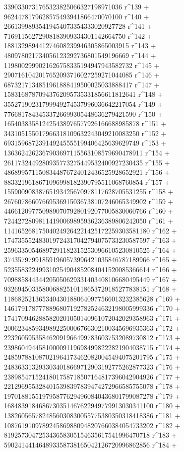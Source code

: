        3390330731765323825066327198971036 r^139 + 
       9624478179628575493941866470070100 r^140 + 
       26613998935419454073354333020927728 r^141 + 
       71691156272908183909334301142664750 r^142 + 
       188132989441274608239946305865003915 r^143 + 
       480978021734056123292736801549196669 r^144 + 
       1198002999021626758335194947943582732 r^145 + 
       2907161042017652093716027259271044085 r^146 + 
       6873217134851961888419500025033888417 r^147 + 
       15831687870943762095735331856611812641 r^148 + 
       35527190231799949274537996036642217054 r^149 + 
       77668178434533726699305448636279421590 r^150 + 
       165403835812425438976577926166688985878 r^151 + 
       343105155017966318109632243049210083250 r^152 + 
       693159687239149245555199406425639629749 r^153 + 
       1363624262367903697115563108579690478911 r^154 + 
       2611732449280935773275449532400927230435 r^155 + 
       4868995711508344876724012436525928652921 r^156 + 
       8833219618671096998182390795511068760854 r^157 + 
       15590090838765193425670978117628705531255 r^158 + 
       26760786607669536915036738107246065349902 r^159 + 
       44661209775098907079280192077005830060766 r^160 + 
       72442728098114190069895936236389806242050 r^161 + 
       114165268175040249264221425172259303581180 r^162 + 
       174735552483019724317042794075733230587597 r^163 + 
       259633505468972911823152530966105230810525 r^164 + 
       374357979918591960573996421035846787189966 r^165 + 
       523558322499310254904852084041520085366614 r^166 + 
       709885844344205050629331403408106680495449 r^167 + 
       932694503358006882510118653729185277838151 r^168 + 
       1186825213653404301880640977566013232385628 r^169 + 
       1461791787778896807192782524632198005999336 r^170 + 
       1741709462885820201050140961072042029358963 r^171 + 
       2006234859349892250006766302100345696935363 r^172 + 
       2232605953584620919664997836037532089730812 r^173 + 
       2398604944581000091196984998222821904038715 r^174 + 
       2485978810870219641734620820045494075201795 r^175 + 
       2483633132933034018669712903192775262877323 r^176 + 
       2389854715241801758718507164817396042904926 r^177 + 
       2212969553284015398397839474272966585755078 r^178 + 
       1970188155197958776294960840436801799087278 r^179 + 
       1684839184686730351467622949779913030341100 r^180 + 
       1382605657824856030830055775380350318418386 r^181 + 
       1087619109789245869880948207660384054733202 r^182 + 
       819257304725343658305154635617541996470718 r^183 + 
       590241441464893358738165042126720996862856 r^184 + 
